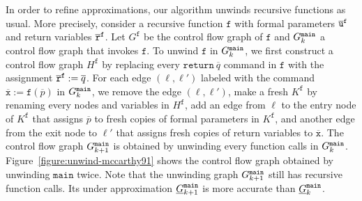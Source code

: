 In order to refine approximations, our algorithm unwinds recursive
functions as usual. More precisely, consider a recursive function
$\mathtt{f}$ with formal parameters $\overline{\mathtt{u}}^{\mathtt{{f}}}$
and return variables $\overline{\mathtt{r}}^{\mathtt{{f}}}$. Let 
$G^{\mathtt{f}}$ be  
the control flow graph of $\mathtt{f}$ and $G^{\mathtt{{main}}}_k$ a
control flow graph 
that invokes $\mathtt{f}$. To unwind $\mathtt{f}$ in $G^{\mathtt{{main}}}_k$, 
we first construct a control flow graph $H^{\mathtt{f}}$ by 
replacing every $\mathtt{return}\ \overline{q}$ command in
$\mathtt{f}$ with the assignment $\mathtt{\overline{r}}^{\mathtt{{f}}} :=
\overline{q}$. For each edge $(\ell,  
\ell')$ labeled with the command $\overline{\mathtt{x}} :=
\mathtt{f}(\overline{p})$ in $G^{\mathtt{{main}}}_k$, we remove 
the edge $(\ell, \ell')$, make a fresh $K^{\mathtt{f}}$ by
renaming every nodes and variables in $H^{\mathtt{f}}$, add an edge
from $\ell$ to the entry node of $K^{\mathtt{f}}$ that assigns
$\overline{p}$ to fresh copies of formal parameters in 
$K^{\mathtt{f}}$, and another edge from the exit node to $\ell'$ that
assigns fresh copies of return variables to
$\overline{\mathtt{x}}$. The control flow graph $G^{\mathtt{{main}}}_{k+1}$ 
is obtained by unwinding every function calls in $G^{\mathtt{{main}}}_k$. 
Figure~\ref{figure:unwind-mccarthy91} shows the control flow graph
obtained by unwinding $\mathtt{main}$ twice. Note that the
unwinding graph $G^{\mathtt{{main}}}_{k+1}$ still has recursive function calls. Its
under approximation $\underline{G}^{\mathtt{{main}}}_{k+1}$ is more
accurate than $\underline{G}^{\mathtt{{main}}}_k$. 

